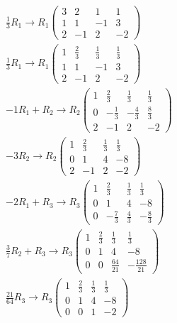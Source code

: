 \begin{example}
\begin{eqnarray*}
\frac{1}{3}R_1\to R_1 \left( \begin{array}{rrr|r}
3 & 2 & 1 & 1\\
1 & 1  & -1 & 3\\
2 & -1 & 2 & -2
\end{array}\right)&&\\
\frac{1}{3}R_1\to R_1 \left( \begin{array}{rrr|r}
1 & \frac{2}{3} & \frac{1}{3} & \frac{1}{3}\\
1 & 1  & -1 & 3\\
2 & -1 & 2 & -2
\end{array}\right)&&\\
-1R_1+R_2\to R_2\left( \begin{array}{rrr|r}
1 & \frac{2}{3} & \frac{1}{3} & \frac{1}{3}\\
0 & -\frac{1}{3}  & -\frac{4}{3} & \frac{8}{3}\\
2 & -1 & 2 & -2
\end{array}\right)&&\\
-3R_2\to R_2\left( \begin{array}{rrr|r}
1 & \frac{2}{3} & \frac{1}{3} & \frac{1}{3}\\
0 & 1  & 4 & -8\\
2 & -1 & 2 & -2
\end{array}\right)&&\\
-2R_1+R_3\to R_3\left( \begin{array}{rrr|r}
1 & \frac{2}{3} & \frac{1}{3} & \frac{1}{3}\\
0 & 1  & 4 & -8\\
0 & -\frac{7}{3} & \frac{4}{3} & -\frac{8}{3}
\end{array}\right)&&\\
\frac{3}{7}R_2+R_3\to R_3\left( \begin{array}{rrr|r}
1 & \frac{2}{3} & \frac{1}{3} & \frac{1}{3}\\
0 & 1  & 4 & -8\\
0 & 0 & \frac{64}{21} & -\frac{128}{21}
\end{array}\right)&&\\
\frac{21}{64}R_3\to R_3\left( \begin{array}{rrr|r}
1 & \frac{2}{3} & \frac{1}{3} & \frac{1}{3}\\
0 & 1  & 4 & -8\\
0 & 0 & 1 & -2
\end{array}\right)&&\\
\end{eqnarray*}


\end{example}
